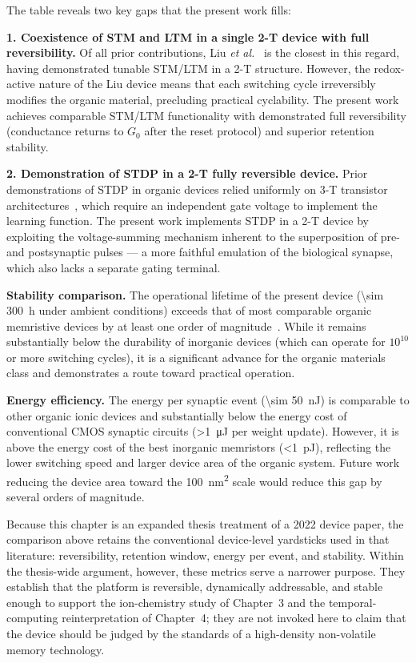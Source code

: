 \documentclass[12pt, a4paper, twoside]{report}
\begin{document}
The table reveals two key gaps that the present work fills:

\textbf{1. Coexistence of STM and LTM in a single 2-T device with full reversibility.} Of all prior contributions, Liu \textit{et al.}~\cite{Liu2016} is the closest in this regard, having demonstrated tunable STM/LTM in a 2-T structure. However, the redox-active nature of the Liu device means that each switching cycle irreversibly modifies the organic material, precluding practical cyclability. The present work achieves comparable STM/LTM functionality with demonstrated full reversibility (conductance returns to $G_0$ after the reset protocol) and superior retention stability.

\textbf{2. Demonstration of STDP in a 2-T fully reversible device.} Prior demonstrations of STDP in organic devices relied uniformly on 3-T transistor architectures~\cite{Gkoupidenis2015, Kim2018, Seo2019}, which require an independent gate voltage to implement the learning function. The present work implements STDP in a 2-T device by exploiting the voltage-summing mechanism inherent to the superposition of pre- and postsynaptic pulses — a more faithful emulation of the biological synapse, which also lacks a separate gating terminal.

\textbf{Stability comparison.} The operational lifetime of the present device (\SI{\sim 300}{\hour} under ambient conditions) exceeds that of most comparable organic memristive devices by at least one order of magnitude~\cite{Shih2017}. While it remains substantially below the durability of inorganic devices (which can operate for $10^{10}$ or more switching cycles), it is a significant advance for the organic materials class and demonstrates a route toward practical operation.

\textbf{Energy efficiency.} The energy per synaptic event (\SI{\sim 50}{\nano\joule}) is comparable to other organic ionic devices and substantially below the energy cost of conventional CMOS synaptic circuits (\SI{>1}{\micro\joule} per weight update). However, it is above the energy cost of the best inorganic memristors (\SI{<1}{\pico\joule}), reflecting the lower switching speed and larger device area of the organic system. Future work reducing the device area toward the \SI{100}{\nano\metre\squared} scale would reduce this gap by several orders of magnitude.

Because this chapter is an expanded thesis treatment of a 2022 device paper, the comparison above retains the conventional device-level yardsticks used in that literature: reversibility, retention window, energy per event, and stability. Within the thesis-wide argument, however, these metrics serve a narrower purpose. They establish that the platform is reversible, dynamically addressable, and stable enough to support the ion-chemistry study of Chapter~3 and the temporal-computing reinterpretation of Chapter~4; they are not invoked here to claim that the device should be judged by the standards of a high-density non-volatile memory technology.
\end{document}
